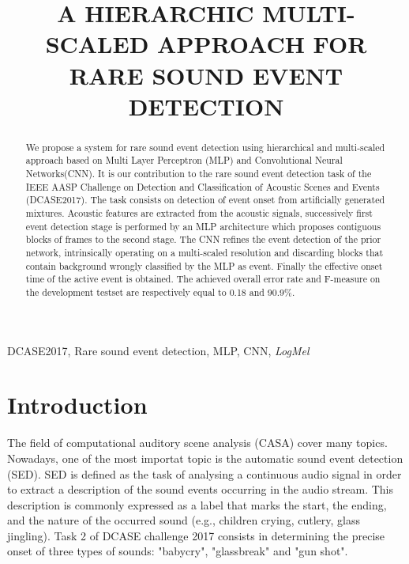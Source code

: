 \documentclass{article}
\title{A HIERARCHIC MULTI-SCALED APPROACH FOR RARE SOUND EVENT DETECTION}
\begin{document}
\ninept
\maketitle

\begin{sloppy}

\begin{abstract}
We propose a system for rare sound event detection using hierarchical and multi-scaled approach based on Multi Layer Perceptron (MLP) and Convolutional Neural Networks(CNN). 
It is our contribution to the rare sound event detection task of the IEEE AASP Challenge on  Detection and Classification of Acoustic Scenes and Events (DCASE2017). The task consists on detection of event onset from artificially generated mixtures. Acoustic features are extracted from the acoustic signals, successively first event detection stage is performed by an MLP architecture which proposes contiguous blocks of frames to the second stage. The CNN refines the event detection of the prior network, intrinsically operating on a multi-scaled resolution and discarding blocks that contain background wrongly classified by the MLP as event. Finally the effective onset time of the active event is obtained.
The achieved overall error rate and F-measure on the development testset are respectively equal to 0.18 and 90.9\%.
\end{abstract}

\begin{keywords}
DCASE2017, Rare sound event detection, MLP, CNN, \textit{LogMel}
\end{keywords}


\section{Introduction}
\label{sec:intro}


The field of computational auditory scene analysis (CASA) cover many topics. Nowadays, one of the most importat topic is the automatic sound event detection (SED). SED is defined as the task of analysing a continuous audio
signal in order to extract a description of the sound events
occurring in the audio stream. This description is commonly
expressed as a label that marks the start, the ending, and the
nature of the occurred sound (e.g., children crying, cutlery,
glass jingling).
Task 2 of DCASE challenge 2017 \cite{dcase2017web} consists in determining the precise onset of three types of sounds: "babycry", "glassbreak" and "gun shot". 


\end{sloppy}
\end{document}
